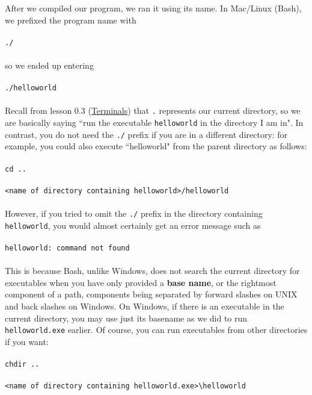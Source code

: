 \documentclass{article}
\begin{document}
After we compiled our program, we ran it using its name. In Mac/Linux (Bash), we prefixed the program name with \\ \\
\verb|./| \\ \\
so we ended up entering \\ \\
\verb|./helloworld| \\ \\
Recall from lesson 0.3 
(\href{https://github.com/partiallyderived/Learn-C-With-Babbo/blob/master/Chapter0_Prerequisites/0.3_Terminals/Terminals.pdf}{Terminals})
that \verb|.| represents our current directory, so we are basically saying 
``run the executable \verb|helloworld| in the directory I am in". In contrast, you do not need the \verb|./| prefix if
you are in a different directory: for example, you could also execute ``helloworld" from the parent directory as 
follows: \\ \\
\verb|cd ..| \\ \\
\verb|<name of directory containing helloworld>/helloworld| \\ \\
However, if you tried to omit the \verb|./| prefix in the directory containing \verb|helloworld|, you would almost
certainly get an error message such as \\ \\
\verb|helloworld: command not found| \\ \\
This is because Bash, unlike Windows, does not search the current directory for executables when you have only provided a 
\textbf{base name}, or the rightmost component of a path, components being separated by forward slashes on UNIX and
back slashes on Windows. On Windows, if there is an executable in the current directory, you may use just its basename
as we did to run \verb|helloworld.exe| earlier. Of course, you can run executables from other directories if you want: \\ \\
\verb|chdir ..| \\ \\
\verb|<name of directory containing helloworld.exe>\helloworld| \\ \\
\end{document}
